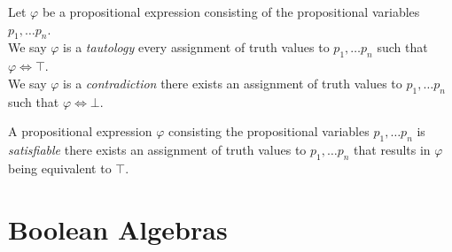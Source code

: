 \begin{definition}
    Let \(\varphi\) be a propositional expression consisting of the propositional variables \(p_1, \dots p_n\).\\
    We say \(\varphi\) is a \emph{tautology}
    \iffbydefn every assignment of truth values to \(p_1, \dots p_n\) such that \(\varphi \iff \top\).\\
    We say \(\varphi\) is a \emph{contradiction}
    \iffbydefn there exists an assignment of truth values to \(p_1, \dots p_n\) such that \(\varphi \iff \bot\).
\end{definition}
\begin{definition}[Satisfiability]
    A propositional expression \(\varphi\) consisting the propositional variables \(p_1, \dots p_n\) is \emph{satisfiable}
    \iffbydefn there exists an assignment of truth values to \(p_1, \dots p_n\) that results in \(\varphi\) being equivalent to \(\top\).
\end{definition}

\section{Boolean Algebras}

